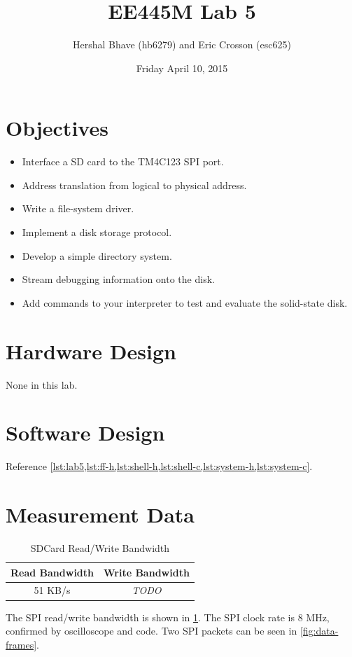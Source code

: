 \documentclass[12pt]{article}
\title{EE445M Lab 5}
\author{Hershal Bhave (hb6279) and Eric Crosson (esc625)}
\date{Friday April 10, 2015}
\newcommand{\todo}{\hfill{\LARGE \emph{\color{red}TODO}}}
\begin{document}
\maketitle

\section{Objectives}
\begin{itemize}

\item Interface a SD card to the TM4C123 SPI port.
\item Address translation from logical to physical address.
\item Write a file-system driver.
\item Implement a disk storage protocol.
\item Develop a simple directory system.
\item Stream debugging information onto the disk.
\item Add commands to your interpreter to test and evaluate the
  solid-state disk.
\end{itemize}

\section{Hardware Design}
None in this lab.

\section{Software Design}
Reference \cref{lst:lab5,lst:ff-h,lst:shell-h,lst:shell-c,lst:system-h,lst:system-c}.

\section{Measurement Data}
\begin{table}
  \centering
  \begin{tabular}{c|c}
    Read Bandwidth & Write Bandwidth \\
    \hline
    51 KB/s & \todo \\
  \end{tabular}
  \caption{SDCard Read/Write Bandwidth}
  \label{tbl:sdcard-bandwidth}
\end{table}

The SPI read/write bandwidth is shown in
\cref{tbl:sdcard-bandwidth}. The SPI clock rate is 8 MHz, confirmed by
oscilloscope and code. Two SPI packets can be seen in
\cref{fig:data-frames}.
\end{document}
